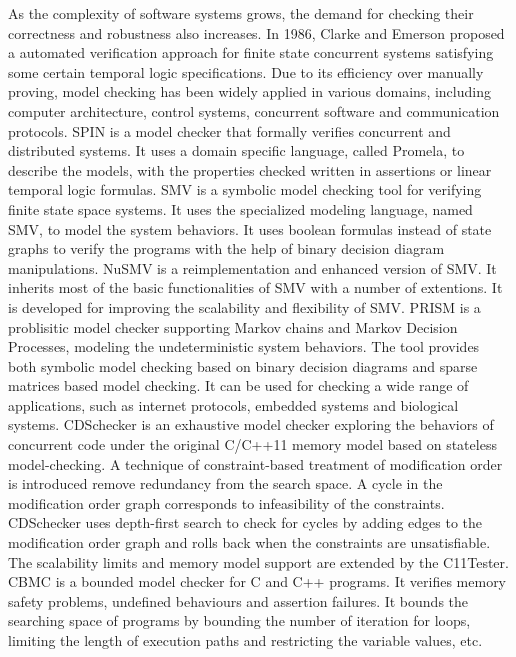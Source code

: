 As the complexity of software systems grows, the demand for checking their correctness and robustness also increases. In 1986, Clarke and Emerson \cite{mc:Clarke} proposed a automated verification approach for finite state concurrent systems satisfying some certain temporal logic specifications. Due to its efficiency over manually proving, model checking has been widely applied in various domains, including computer architecture, control systems, concurrent software and communication protocols.
SPIN\cite{mc:spin} is a model checker that formally verifies concurrent and distributed systems. It uses a domain specific language, called Promela, to describe the models, with the properties checked written in assertions or linear temporal logic formulas.
SMV\cite{mc:smv} is a symbolic model checking tool for verifying finite state space systems. It uses the specialized modeling language, named SMV, to model the system behaviors. It uses boolean formulas instead of state graphs to verify the programs with the help of binary decision diagram manipulations.
NuSMV\cite{mc:NuSMV} is a reimplementation and enhanced version of SMV. It inherits most of the basic functionalities of SMV with a number of extentions. It is developed for improving the scalability and flexibility of SMV.
PRISM\cite{mc:PRISM} is a problisitic model checker supporting Markov chains and Markov Decision Processes, modeling the undeterministic system behaviors. The tool provides both symbolic model checking based on binary decision diagrams and sparse matrices based model checking. It can be used for checking a wide range of applications, such as internet protocols, embedded systems and biological systems.
CDSchecker\cite{cdschecker} is an exhaustive model checker exploring the behaviors of concurrent code under the original C/C++11 memory model based on stateless model-checking. A technique of constraint-based treatment of modification order is introduced remove redundancy from the search space. A cycle in the modification order graph corresponds to infeasibility of the constraints. CDSchecker uses depth-first search to check for cycles by adding edges to the modification order graph and rolls back when the constraints are unsatisfiable. The scalability limits and memory model support are extended by the C11Tester.
CBMC\cite{mc:CBMC} is a bounded model checker for C and C++ programs. It verifies memory safety problems, undefined behaviours and assertion failures. It bounds the searching space of programs by bounding the number of iteration for loops, limiting the length of execution paths and restricting the variable values, etc.

